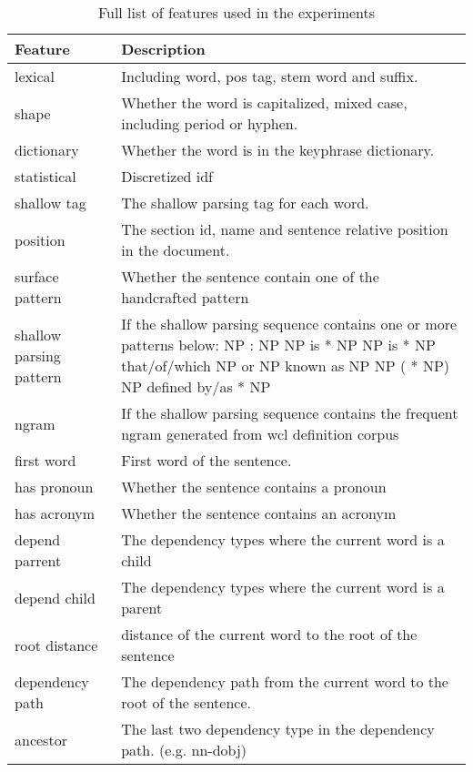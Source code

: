 \documentclass[hyp]{socreport}
\begin{document}
\begin{table}
	
    \centering
    \begin{tabular}{|p{3cm}|p{12cm}|}
\hline
        \bf{Feature}                            & \bf{Description}   \\ \hline
	 	lexical & Including word, pos tag, stem word and suffix.\\ \hline
	 	shape & Whether the word is capitalized, mixed case, including period or hyphen. \\ \hline
	 	dictionary & Whether the word is in the keyphrase dictionary. \\ \hline
	 	statistical & Discretized idf \\ \hline
	 	shallow tag & The shallow parsing tag for each word. \\ \hline 
		position & The section id, name and sentence relative position in the document.  \\ \hline	 	
	 	surface pattern & Whether the sentence contain one of the handcrafted pattern \\ \hline
	 	shallow parsing pattern & If the shallow parsing sequence contains one or more patterns below: \newline NP : NP \newline NP is * NP \newline NP is * NP that/of/which \newline NP or NP \newline known as NP \newline NP ( * NP) \newline NP defined by/as * NP \\ \hline
	 	ngram & If the shallow parsing sequence contains the frequent ngram generated from wcl definition corpus \\ \hline
	 	first word & First word of the sentence. \\ \hline
	 	has pronoun & Whether the sentence contains a pronoun \\ \hline
		has acronym & Whether the sentence contains an acronym \\ \hline
		depend parrent & The dependency types where the current word is a child \\ \hline
		depend child & The dependency types where the current word is a parent \\ \hline
		root distance & distance of the current word to the root of the sentence \\ \hline
		dependency path & The dependency path from the current word to the root of the sentence. \\ \hline
		ancestor & The last two dependency type in the dependency path. (e.g. nn-dobj) \\ \hline
	 	
    \end{tabular}
    \caption{Full list of features used in the experiments}
    \label{fullfeature}
\end{table}
\end{document}
